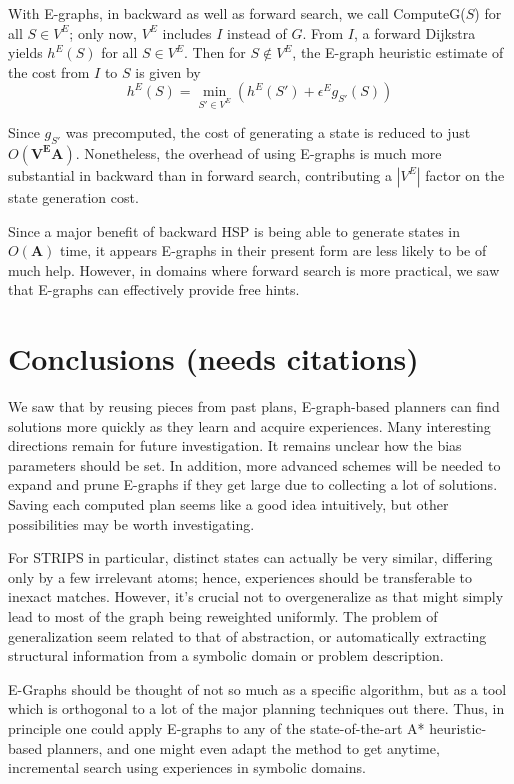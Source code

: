\documentclass[letterpaper]{article}
\begin{document}
With E-graphs, in backward as well as forward search, we call ComputeG($S$) for all $S\in V^E$; only now, $V^E$ includes $I$ instead of $G$. From $I$, a forward Dijkstra yields $h^E(S)$ for all $S\in V^E$. Then for $S\notin V^E$, the E-graph heuristic estimate of the cost from $I$ to $S$ is given by
\[h^E(S) = \min_{S'\in V^E}\left(h^E(S') + \epsilon^E g_{S'}(S) \right)\]

Since $g_{S'}$ was precomputed, the cost of generating a state is reduced to just $O(\mathbf{V^EA})$. Nonetheless, the overhead of using E-graphs is much more substantial in backward than in forward search, contributing a $|V^E|$ factor on the state generation cost.

Since a major benefit of backward HSP is being able to generate states in $O(\mathbf{A})$ time, it appears E-graphs in their present form are less likely to be of much help. However, in domains where forward search is more practical, we saw that E-graphs can effectively provide free hints.

\section{Conclusions (needs citations)}

We saw that by reusing pieces from past plans, E-graph-based planners can find solutions more quickly as they learn and acquire experiences. Many interesting directions remain for future investigation. It remains unclear how the bias parameters should be set. In addition, more advanced schemes will be needed to expand and prune E-graphs if they get large due to collecting a lot of solutions. Saving each computed plan seems like a good idea intuitively, but other possibilities may be worth investigating.

For STRIPS in particular, distinct states can actually be very similar, differing only by a few irrelevant atoms; hence, experiences should be transferable to inexact matches. However, it's crucial not to overgeneralize as that might simply lead to most of the graph being reweighted uniformly. The problem of generalization seem related to that of abstraction, or automatically extracting structural information from a symbolic domain or problem description.

E-Graphs should be thought of not so much as a specific algorithm, but as a tool which is orthogonal to a lot of the major planning techniques out there. Thus, in principle one could apply E-graphs to any of the state-of-the-art A* heuristic-based planners, and one might even adapt the method to get anytime, incremental search using experiences in symbolic domains.
\end{document}
